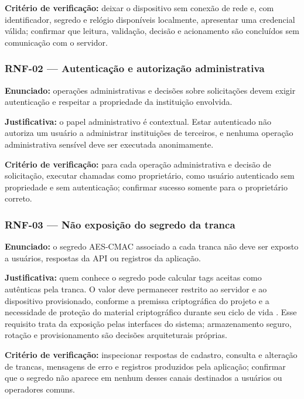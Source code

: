\textbf{Critério de verificação:} deixar o dispositivo sem conexão de rede e, com identificador, segredo e relógio disponíveis localmente, apresentar uma credencial válida; confirmar que leitura, validação, decisão e acionamento são concluídos sem comunicação com o servidor.

\subsubsection*{RNF-02 --- Autenticação e autorização administrativa}

\textbf{Enunciado:} operações administrativas e decisões sobre solicitações devem exigir autenticação e respeitar a propriedade da instituição envolvida.

\textbf{Justificativa:} o papel administrativo é contextual. Estar autenticado não autoriza um usuário a administrar instituições de terceiros, e nenhuma operação administrativa sensível deve ser executada anonimamente.

\textbf{Critério de verificação:} para cada operação administrativa e decisão de solicitação, executar chamadas como proprietário, como usuário autenticado sem propriedade e sem autenticação; confirmar sucesso somente para o proprietário correto.

\subsubsection*{RNF-03 --- Não exposição do segredo da tranca}

\textbf{Enunciado:} o segredo AES-CMAC associado a cada tranca não deve ser exposto a usuários, respostas da API ou registros da aplicação.

\textbf{Justificativa:} quem conhece o segredo pode calcular tags aceitas como autênticas pela tranca. O valor deve permanecer restrito ao servidor e ao dispositivo provisionado, conforme a premissa criptográfica do projeto e a necessidade de proteção do material criptográfico durante seu ciclo de vida \cite{barker2020keymanagement}. Esse requisito trata da exposição pelas interfaces do sistema; armazenamento seguro, rotação e provisionamento são decisões arquiteturais próprias.

\textbf{Critério de verificação:} inspecionar respostas de cadastro, consulta e alteração de trancas, mensagens de erro e registros produzidos pela aplicação; confirmar que o segredo não aparece em nenhum desses canais destinados a usuários ou operadores comuns.

